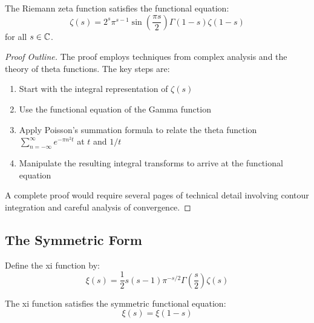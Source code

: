 \begin{theorem}
\label{thm:riemann_functional_equation}
The Riemann zeta function satisfies the functional equation:
\begin{equation}
\zeta(s) = 2^s \pi^{s-1} \sin\left(\frac{\pi s}{2}\right) \Gamma(1-s) \zeta(1-s)
\label{eq:riemann_functional_equation}
\end{equation}
for all $s \in \mathbb{C}$.
\end{theorem}

\begin{proof}[Proof Outline]
The proof employs techniques from complex analysis and the theory of theta functions. The key steps are:
\begin{enumerate}
\item Start with the integral representation of $\zeta(s)$
\item Use the functional equation of the Gamma function
\item Apply Poisson's summation formula to relate the theta function $\sum_{n=-\infty}^{\infty} e^{-\pi n^2 t}$ at $t$ and $1/t$
\item Manipulate the resulting integral transforms to arrive at the functional equation
\end{enumerate}
A complete proof would require several pages of technical detail involving contour integration and careful analysis of convergence.
\end{proof}

\subsection{The Symmetric Form}

\begin{definition}[Xi Function]
\label{def:xi_function}
Define the xi function by:
\begin{equation}
\xi(s) = \frac{1}{2}s(s-1)\pi^{-s/2}\Gamma\left(\frac{s}{2}\right)\zeta(s)
\label{eq:xi_definition}
\end{equation}
\end{definition}

\begin{theorem}
\label{thm:symmetric_functional_equation}
The xi function satisfies the symmetric functional equation:
\begin{equation}
\xi(s) = \xi(1-s)
\label{eq:xi_symmetric}
\end{equation}
\end{theorem}

